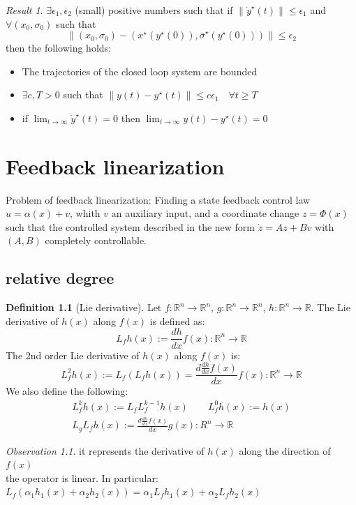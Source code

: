 \documentclass{book}
\newcommand{\R}{\mathbb{R}}
\theoremstyle{definition}
\newtheorem{definition}{Definition}[section]
\theoremstyle{remark}
\theoremstyle{remark}
\newtheorem*{result}{Result}
\newtheorem*{observation}{Observation}
\begin{document}
\begin{result}
    $\exists \epsilon_1, \epsilon_2$ (small) positive numbers such that if $\|\dot{y}^\star(t)\|\leq\epsilon_1$ and $\forall (x_0,\sigma_0)$ such that
    \[
        \|(x_0,\sigma_0)-(x^\star(y^\star(0)),\bar{\sigma}^\star(y^\star(0)))\|\leq\epsilon_2
    \]
    then the following holds:
    \begin{itemize}
        \item The trajectories of the closed loop system are bounded
        \item $\exists c,T>0$ such that $\|y(t)-y^\star(t)\|\leq c\epsilon_1 \quad \forall t \geq T$
        \item if $\lim_{t\to\infty}\dot{y}^\star(t)=0$ then $\lim_{t\to\infty}y(t)-y^\star(t)=0$
        \end{itemize}
\end{result}

\chapter{Feedback linearization}
Problem of feedback linearization: Finding a state feedback control law $u=\alpha(x)+v$, whith $v$ an auxiliary input, and a coordinate change $z=\Phi(x)$ such that the controlled system described in the new form $\dot{z}=Az+Bv$ with $(A,B)$ completely controllable.
\section{relative degree}
\begin{definition}[Lie derivative]
    Let $f:\R^n\to\R^n$, $g:\R^n\to\R^n$, $h:\R^n\to\R$. The Lie derivative of $h(x)$ along $f(x)$ is defined as:
    \[
        L_fh(x):=\frac{dh}{dx}f(x):\R^n\to\R
    \]
    The 2nd order Lie derivative of $h(x)$ along $f(x)$ is:
    \[
        L_f^2h(x):=L_f(L_fh(x))=\frac{d\frac{dh}{dx}f(x)}{dx}f(x):\R^n\to\R
    \]
    We also define the following:
    \begin{gather*}
        L_f^kh(x):=L_fL_f^{k-1}h(x) \qquad L_f^0h(x):=h(x)\\
        L_gL_fh(x):=\frac{d\frac{dh}{dx}f(x)}{dx}g(x):R^n\to\R
    \end{gather*}
\end{definition}
\begin{observation}
    it represents the derivative of $h(x)$ along the direction of $f(x)$\\
    the operator is linear. In particular: $L_f(\alpha_1h_1(x)+\alpha_2h_2(x))=\alpha_1L_fh_1(x)+\alpha_2L_fh_2(x)$
\end{observation}
\end{document}

